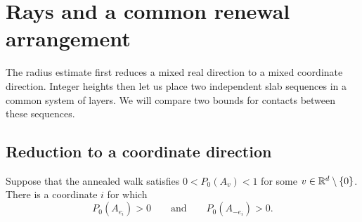 \section{Rays and a common renewal arrangement}\label{sec:arrangement}

The radius estimate first reduces a mixed real direction to a mixed
coordinate direction.  Integer heights then let us place two independent
slab sequences in a common system of layers.  We will compare two bounds
for contacts between these sequences.

\subsection{Reduction to a coordinate direction}

\begin{proposition}\label{prop:coordinate-reduction}
Suppose that the annealed walk satisfies
$0<P_0(A_v)<1$ for some $v\in\mathbb R^d\setminus\{0\}$.
There is a coordinate $i$ for which
\[
 P_0(A_{e_i})>0\qquad\text{and}\qquad P_0(A_{-e_i})>0.
\]
\end{proposition}


